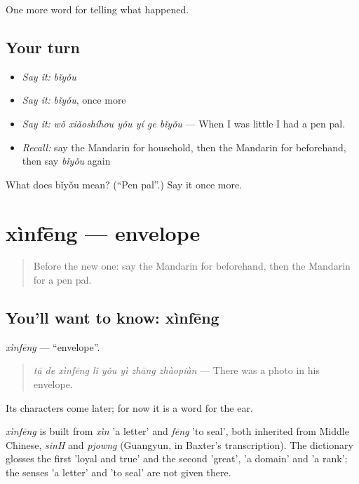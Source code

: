 \begin{grammarlens}[title={What you've built}]
One more word for telling what happened.
\end{grammarlens}

\subsection*{Your turn}
\begin{itemize}
\raggedright
  \item \emph{Say it:} \emph{bǐyǒu}
  \item \emph{Say it:} \emph{bǐyǒu}, once more
  \item \emph{Say it:} \emph{wǒ xiǎoshíhou yǒu yí ge bǐyǒu} — When I was little I had a pen pal.
  \item \emph{Recall:} say the Mandarin for household, then the Mandarin for beforehand, then say \emph{bǐyǒu} again
\end{itemize}

\begin{tcolorbox}[breakable,colback=teal!4,colframe=teal!35!black,title={Before you move on}]
What does bǐyǒu mean? (\textquotedblleft{}Pen pal\textquotedblright{}.) Say it once more.
\end{tcolorbox}
\section[xìnfēng]{xìnfēng — envelope}

\label{lesson:ZH-C318-xinfeng}



\begin{quote}
Before the new one: say the Mandarin for beforehand, then the Mandarin for a pen pal.
\end{quote}

\subsection*{You'll want to know: xìnfēng}
\emph{xìnfēng} — \textquotedblleft{}envelope\textquotedblright{}.

\begin{quote}
\emph{tā de xìnfēng lǐ yǒu yì zhāng zhàopiàn} — There was a photo in his envelope.
\end{quote}

Its characters come later; for now it is a word for the ear.

\begin{cousinweb}
\emph{xìnfēng} is built from \emph{xìn} 'a letter' and \emph{fēng} 'to seal', both inherited from Middle Chinese, \emph{sinH} and \emph{pjowng} (Guangyun, in Baxter's transcription). The dictionary glosses the first 'loyal and true' and the second 'great', 'a domain' and 'a rank'; the senses 'a letter' and 'to seal' are not given there.
\end{cousinweb}


